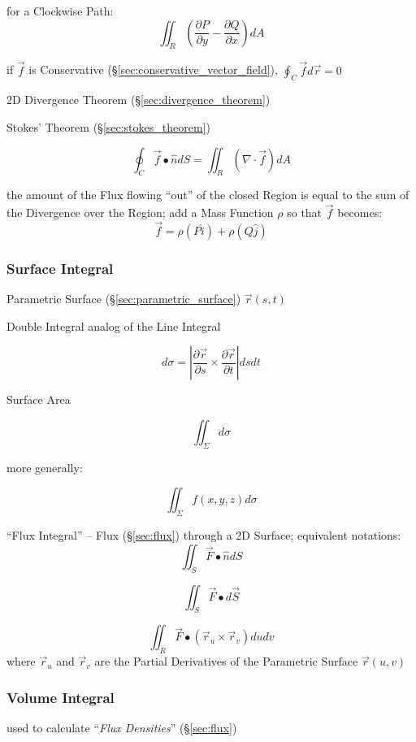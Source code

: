 for a Clockwise Path:
\[
  \iint_R (\frac{\partial{P}}{\partial{y}} - \frac{\partial{Q}}{\partial{x}}) dA
\]

if $\vec{f}$ is Conservative (\S\ref{sec:conservative_vector_field}), $\oint_C
\vec{f} d\vec{r} = 0$

\fist 2D Divergence Theorem (\S\ref{sec:divergence_theorem})

\fist Stokes' Theorem (\S\ref{sec:stokes_theorem})

\[
  \oint_C \vec{f} \bullet \hat{n} dS = \iint_R (\nabla \cdot \vec{f}) dA
\]

the amount of the Flux flowing ``out'' of the closed Region is equal to the sum
of the Divergence over the Region; add a Mass Function $\rho$ so that $\vec{f}$
becomes:
\[
  \vec{f} = \rho(P\hat{i}) + \rho(Q\hat{j})
\]



\subsubsection{Surface Integral}\label{sec:surface_integral}

Parametric Surface (\S\ref{sec:parametric_surface})
$\vec{r}(s,t)$

Double Integral analog of the Line Integral

\[
  d\sigma =
    |\frac{\partial{\vec{r}}}{\partial{s}}
      \times \frac{\partial{\vec{r}}}{\partial{t}}| ds dt
\]

Surface Area

\[
  {\iint}_{\Sigma} d\sigma
\]

more generally:

\[
  {\iint}_{\Sigma} f(x,y,z) d\sigma
\]

``Flux Integral'' -- Flux (\S\ref{sec:flux}) through a 2D Surface; equivalent
notations:
\[
  \iint_{S} \vec{F} \bullet \hat{n} dS
\]

\[
  \iint_{S} \vec{F} \bullet d\vec{S}
\]

\[
  \iint_{R} \vec{F} \bullet (\vec{r}_u \times \vec{r}_v) du dv
\]
where $\vec{r}_u$ and $\vec{r}_v$ are the Partial Derivatives of the Parametric
Surface $\vec{r}(u,v)$



\subsubsection{Volume Integral}\label{sec:volume_integral}

used to calculate ``\emph{Flux Densities}'' (\S\ref{sec:flux}) %



